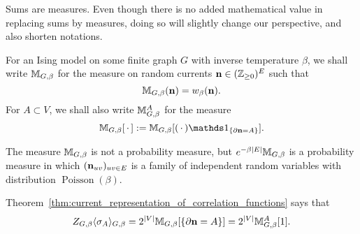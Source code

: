 \begin{definition}
    Sums are measures.
    Even though there is no added mathematical value in replacing sums by measures,
    doing so will slightly change our perspective,
    and also shorten notations.

    For an Ising model on some finite graph $G$ with inverse temperature
    $\beta$, we shall write
    \(
        \mathbb M_{G,\beta}
    \)
    for the measure on random currents $\mathbf{n}\in(\mathbb Z_{\geq 0})^E$
    such that
    \[
        \mathbb M_{G,\beta}(\mathbf{n})=w_\beta(\mathbf{n}).
    \]
    For $A\subset V$, we shall also write $\mathbb M_{G,\beta}^A$
    for the measure
    \[
        \M_{G,\beta}[\blank]:=\M_{G,\beta}[(\blank)\ind{\{\partial\n=A\}}].
    \]
\end{definition}

\begin{corollary}
        The measure $\mathbb M_{G,\beta}$ is not a probability measure,
        but $e^{-\beta|E|}\mathbb M_{G,\beta}$ is a probability measure
        in which $(\mathbf{n}_{uv})_{uv\in E}$ is a family of independent
        random variables with distribution $\operatorname{Poisson}(\beta)$.
\end{corollary}

\begin{corollary}
    \label{cor:current_representation_of_correlation_functions}
    Theorem~\ref{thm:current_representation_of_correlation_functions}
    says that 
    \[
        Z_{G,\beta}\langle\sigma_A\rangle_{G,\beta}
        =2^{|V|}\mathbb M_{G,\beta}[\{\partial\mathbf{n}=A\}]
        =2^{|V|}\mathbb M_{G,\beta}^A[1].
    \]
\end{corollary}
